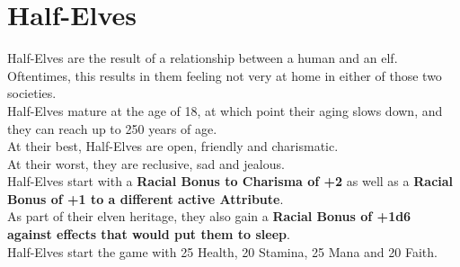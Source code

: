 \section{Half-Elves}\label{species:half-elves}
Half-Elves are the result of a relationship between a human and an elf.
Oftentimes, this results in them feeling not very at home in either of those two societies.\\
Half-Elves mature at the age of 18, at which point their aging slows down, and they can reach up to 250 years of age.\\
At their best, Half-Elves are open, friendly and charismatic.\\
At their worst, they are reclusive, sad and jealous.\\
Half-Elves start with a \textbf{Racial Bonus to Charisma of +2} as well as a \textbf{Racial Bonus of +1 to a different active Attribute}.\\
As part of their elven heritage, they also gain a \textbf{Racial Bonus of +1d6 against effects that would put them to sleep}.\\
Half-Elves start the game with 25 Health, 20 Stamina, 25 Mana and 20 Faith.